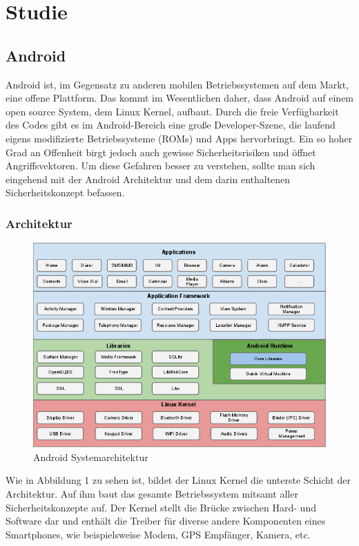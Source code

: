 \chapter{Studie}
\section{Android}
Android ist, im Gegensatz zu anderen mobilen Betriebssystemen auf dem Markt, eine offene Plattform. Das kommt im Wesentlichen daher, dass Android auf einem open source System, dem Linux Kernel, aufbaut. Durch die freie Verfügbarkeit des Codes gibt es im Android-Bereich eine große Developer-Szene, die laufend eigens modifizierte Betriebssysteme (ROMs) und Apps hervorbringt.
Ein so hoher Grad an Offenheit birgt jedoch auch gewisse Sicherheitsrisiken und öffnet Angriffsvektoren. Um diese Gefahren besser zu verstehen, sollte man sich eingehend mit der Android Architektur und dem darin enthaltenen Sicherheitskonzept befassen.

\subsection{Architektur}
\begin{figure}[H]
\centering
\includegraphics[scale=0.7]{Images/android_stack}
\caption{Android Systemarchitektur}
\end{figure}
Wie in Abbildung 1 zu sehen ist, bildet der Linux Kernel die unterste Schicht der Architektur. Auf ihm baut das gesamte Betriebssystem mitsamt aller Sicherheitskonzepte auf. Der Kernel stellt die Brücke zwischen Hard- und Software dar und enthält die Treiber für diverse andere Komponenten eines Smartphones, wie beispielsweise Modem, GPS Empfänger, Kamera, etc. 
